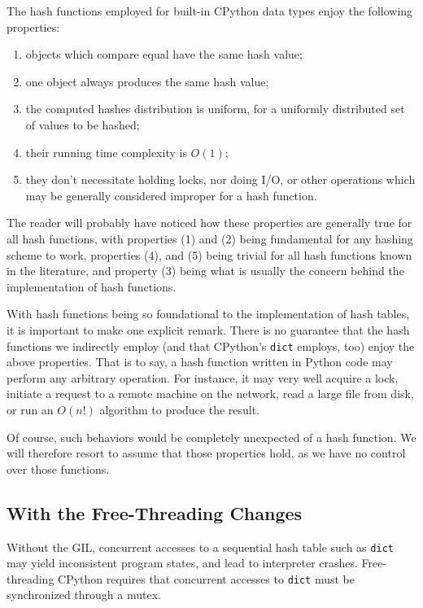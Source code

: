The hash functions employed for built-in CPython data types enjoy the following properties:
\begin{enumerate}
	\item objects which compare equal have the same hash value;
	\item one object always produces the same hash value;
	\item the computed hashes distribution is uniform, for a uniformly distributed set of values to be hashed;
	\item their running time complexity is $O(1)$;
	\item they don't necessitate holding locks, nor doing I/O, or other operations which may be generally considered improper for a hash function.
\end{enumerate}
The reader will probably have noticed how these properties are generally true for all hash functions, with properties (1) and (2) being fundamental for any hashing scheme to work, properties (4), and (5) being trivial for all hash functions known in the literature, and property (3) being what is usually the concern behind the implementation of hash functions.

With hash functions being so foundational to the implementation of hash tables, it is important to make one explicit remark.
There is no guarantee that the hash functions we indirectly employ (and that CPython's \texttt{dict} employs, too) enjoy the above properties.
That is to say, a hash function written in Python code may perform any arbitrary operation.
For instance, it may very well acquire a lock, initiate a request to a remote machine on the network, read a large file from disk, or run an $O(n!)$ algorithm to produce the result.

Of course, such behaviors would be completely unexpected of a hash function.
We will therefore resort to assume that those properties hold, as we have no control over those functions.


\subsection{With the Free-Threading Changes}\label{subsec:dict-free-threading}

Without the GIL, concurrent accesses to a sequential hash table such as \texttt{dict} may yield inconsistent program states, and lead to interpreter crashes.
Free-threading CPython requires that concurrent accesses to \texttt{dict} must be synchronized through a mutex.

